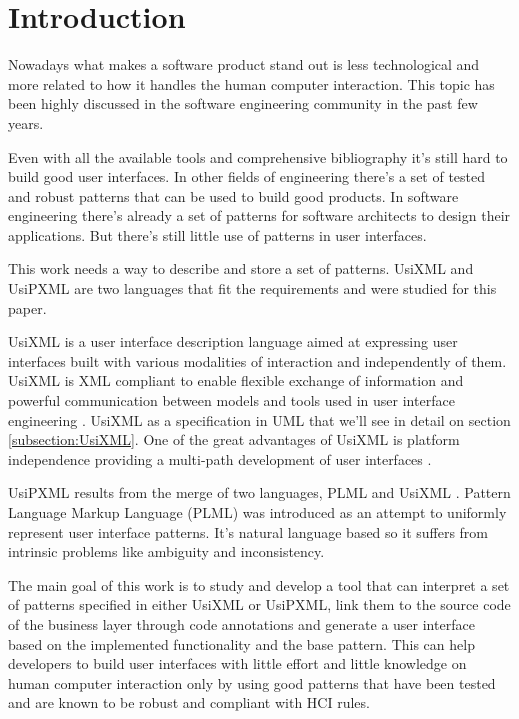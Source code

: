 \section{Introduction}
Nowadays what makes a software product stand out is less technological and more related to how it handles the human computer interaction. This topic has been highly discussed in the software engineering community in the past few years.

Even with all the available tools and comprehensive bibliography it's still hard to build good user interfaces. In other fields of engineering there's a set of tested and robust patterns that can be used to build good products. In software engineering there's already a set of patterns for software architects to design their applications. But there's still little use of patterns in user interfaces.

This work needs a way to describe and store a set of patterns. UsiXML and UsiPXML are two languages that fit the requirements and were studied for this paper.
 
UsiXML is a user interface description language aimed at expressing user interfaces built with various modalities of interaction and independently of them. UsiXML is XML compliant to enable flexible exchange of information and powerful communication between models and tools used in user interface engineering \cite{UsiXML_USer_Interface_eXtensible_Markup_Language}. UsiXML as a specification in UML that we'll see in detail on section \ref{subsection:UsiXML}. One of the great advantages of UsiXML is platform independence providing a multi-path development of user interfaces \cite{UsiXML_a_Language_Supporting_Multi-Path_Development_of_User_Interfaces}.


UsiPXML results from the merge of two languages, PLML \cite{Pattern_Language_Markup_Language} and UsiXML \cite{Different_kinds_of_pattern_support_for_interactive_systems}. Pattern Language Markup Language (PLML) was introduced as an attempt to uniformly represent user interface patterns. It's natural language based so it suffers from intrinsic problems like ambiguity and inconsistency.

The main goal of this work is to study and develop a tool that can interpret a set of patterns specified in either UsiXML or UsiPXML, link them to the source code of the business layer through code annotations and generate a user interface based on the implemented functionality and the base pattern. This can help developers to build user interfaces with little effort and little knowledge on human computer interaction only by using good patterns that have been tested and are known to be robust and compliant with HCI rules.

